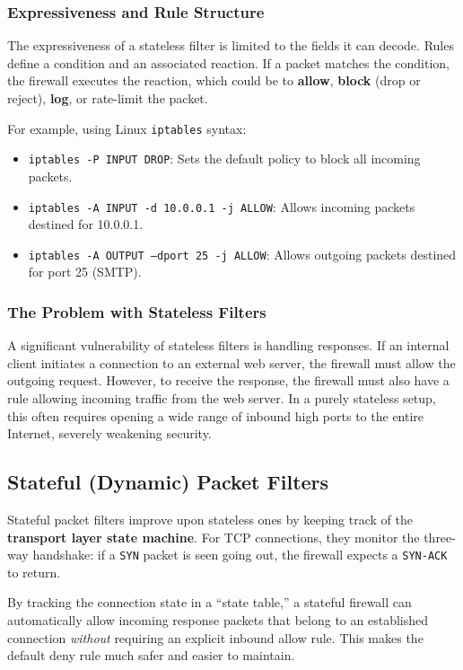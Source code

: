\subsubsection{Expressiveness and Rule Structure}

The expressiveness of a stateless filter is limited to the fields it can decode. Rules define a condition and an associated reaction. If a packet matches the condition, the firewall executes the reaction, which could be to \textbf{allow}, \textbf{block} (drop or reject), \textbf{log}, or rate-limit the packet.

For example, using Linux \texttt{iptables} syntax:
\begin{itemize}
    \item \texttt{iptables -P INPUT DROP}: Sets the default policy to block all incoming packets.
    \item \texttt{iptables -A INPUT -d 10.0.0.1 -j ALLOW}: Allows incoming packets destined for 10.0.0.1.
    \item \texttt{iptables -A OUTPUT --dport 25 -j ALLOW}: Allows outgoing packets destined for port 25 (SMTP).
\end{itemize}

\subsubsection{The Problem with Stateless Filters}

A significant vulnerability of stateless filters is handling responses. If an internal client initiates a connection to an external web server, the firewall must allow the outgoing request. However, to receive the response, the firewall must also have a rule allowing incoming traffic from the web server. In a purely stateless setup, this often requires opening a wide range of inbound high ports to the entire Internet, severely weakening security.

\subsection{Stateful (Dynamic) Packet Filters}

Stateful packet filters improve upon stateless ones by keeping track of the \textbf{transport layer state machine}. For TCP connections, they monitor the three-way handshake: if a \texttt{SYN} packet is seen going out, the firewall expects a \texttt{SYN-ACK} to return.

By tracking the connection state in a ``state table,'' a stateful firewall can automatically allow incoming response packets that belong to an established connection \textit{without} requiring an explicit inbound allow rule. This makes the default deny rule much safer and easier to maintain.

